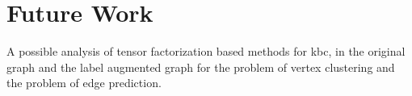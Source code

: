\documentclass{tufte-handout}
\begin{document}
\clearpage
\section{Future Work}
\label{sec:future-work}
A possible analysis of tensor factorization based methods for kbc, in the
original graph and the label augmented graph for the problem of vertex
clustering and the problem of edge prediction.



\end{document}
